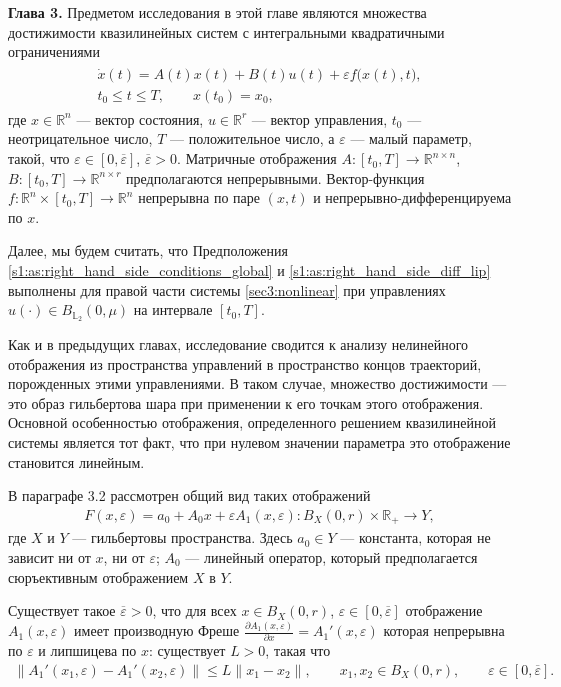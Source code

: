 \documentclass[../abstract.tex]{subfiles}
\begin{document}
\textbf{Глава 3.}
Предметом исследования в этой главе являются множества достижимости квазилинейных систем с интегральными квадратичными ограничениями
\begin{gather}\label{sec3:nonlinear}
	\begin{gathered}
	\dot{x}(t) = A(t)x(t)+B(t)u(t)+\varepsilon f\big(x(t),t\big), \\ t_0 \leqslant t \leqslant T, \qquad x(t_0) = x_0,
	\end{gathered}
\end{gather}
где $ x \in \mathbb{R}^n $ --- вектор состояния, $ u \in \mathbb{R}^r $ --- вектор управления, $t_0$ --- неотрицательное число, $T$ --- положительное число, а $\varepsilon$ --- малый параметр, такой, что $\varepsilon \in [0,\overline{\varepsilon}]$, $ \overline{\varepsilon} > 0$. 
Матричные отображения $A:[t_0,T] \to \mathbb{R}^{n\times n} $, $B: [t_0,T] \to \mathbb{R}^{n\times r} $ предполагаются непрерывными. 
Вектор-функция $f: \mathbb{R}^n \times [t_0,T] \to \mathbb{R}^n$ непрерывна по паре $(x, t)$ и непрерывно-дифференцируема по $x$.

Далее, мы будем считать, что Предположения \ref{s1:as:right_hand_side_conditions_global} и \ref{s1:as:right_hand_side_diff_lip} выполнены для правой части системы \eqref{sec3:nonlinear} при управлениях $ u(\cdot) \in B_{\mathbb{L}_2}(0,\mu) $ на интервале $ [t_0, T]$.

Как и в предыдущих главах, исследование сводится к анализу нелинейного отображения из пространства управлений в пространство концов траекторий, порожденных этими управлениями.
В таком случае, множество достижимости --- это образ гильбертова шара при применении к его точкам этого отображения. 
Основной особенностью отображения, определенного решением квазилинейной системы является тот факт, что при нулевом значении параметра это отображение становится линейным.

В параграфе 3.2 рассмотрен общий вид таких отображений
\begin{gather*} 
	F(x, \varepsilon) = a_0 + A_0x + \varepsilon A_1(x,\varepsilon): B_X(0, r) \times \mathbb{R}_+ \rightarrow Y,
\end{gather*} 
где $X$ и $Y$ --- гильбертовы пространства.
Здесь $a_0 \in Y$ --- константа, которая не зависит ни от $x$, ни от $\varepsilon$; $A_0$ --- линейный оператор, который предполагается сюръективным отображением $X$ в $Y$. 

\begin{assumption}\label{as:derivative_of_A1}
	Существует такое $\overline{\varepsilon} > 0$, что для всех $x \in B_X(0,r)$, $\varepsilon \in [0, \overline{\varepsilon}]$ отображение $A_1(x, \varepsilon)$ имеет производную Фреше $\frac{\partial A_1(x, \varepsilon)}{\partial x} = A_1'(x, \varepsilon)$ которая непрерывна по $\varepsilon$ и липшицева по $x$: существует $L>0$, такая что
	\begin{gather*}
		\|A_1'(x_1,\varepsilon) - A_1'(x_2,\varepsilon) \| \leqslant L\|x_1-x_2\|, \qquad x_1, x_2 \in B_X(0,r), \qquad \varepsilon \in [0, \overline{\varepsilon}].
	\end{gather*}
\end{assumption}
\end{document}
